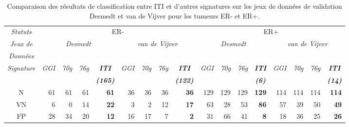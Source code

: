       \begin{sidewaystable}
        \begin{center}
          \caption{Comparaison des résultats de classification entre ITI et d'autres signatures sur les jeux de données de validation Desmedt et van de Vijver pour les tumeurs ER- et ER+.}
          \begin{tabular}{crrrrrrrrrrrrrrrr}
            \toprule
            \multicolumn{1}{c}{\emph{Statuts}} & \multicolumn{8}{c}{ER-} & \multicolumn{8}{c}{ER+} \\
            \cmidrule(r){2-9}\cmidrule(r){10-17}
            \multicolumn{1}{c}{\emph{Jeux de}} & \multicolumn{4}{c}{\multirow{2}{*}{\emph{Desmedt}}} & \multicolumn{4}{c}{\multirow{2}{*}{\emph{van de Vijver}}} & \multicolumn{4}{c}{\multirow{2}{*}{\emph{Desmedt}}} & \multicolumn{4}{c}{\multirow{2}{*}{\emph{van de Vijver}}} \\
            \multicolumn{1}{c}{\emph{Données}} & & & & \\
            \cmidrule(r){2-5}\cmidrule(r){6-9}\cmidrule(r){10-13}\cmidrule(r){14-17}
            \multirow{2}{*}{\emph{Signature}} & \emph{GGI} & \emph{70g} & \emph{76g} & \multicolumn{1}{c}{\emph{\textbf{ITI}}} & \emph{GGI} & \emph{70g} & \emph{76g} & \multicolumn{1}{c}{\emph{\textbf{ITI}}} & \emph{GGI} & \emph{70g} & \emph{76g} & \multicolumn{1}{c}{\emph{\textbf{ITI}}} & \emph{GGI} & \emph{70g} & \emph{76g} & \multicolumn{1}{c}{\emph{\textbf{ITI}}}    \\
                      &     &     &     & \multicolumn{1}{c}{\emph{\textbf{(165)}}}              &     &     &     & \multicolumn{1}{c}{\emph{\textbf{(122)}}}  &     &     &     & \multicolumn{1}{c}{\emph{\textbf{(6)}}}                &     &     &     & \multicolumn{1}{c}{\emph{\textbf{(14)}}}   \\
            \midrule
            N         & 61    & 61    & 61    & \textbf{61}                               & 36    & 36    & 36    & \textbf{36}                   & 129   & 129   & 129   & \textbf{129}                              & 114   & 114   & 114   & \textbf{114}                   \\
            \midrule
            VN        & 6     & 0     & 14    & \textbf{22}                               & 3     & 2     & 12    & \textbf{17}                   & 63    & 28    & 53    & \textbf{86}                               & 57    & 39    & 50    & \textbf{49}                    \\
            FP        & 28    & 34    & 20    & \textbf{12}                               & 16    & 17    & 7     & \textbf{2}                    & 31    & 66    & 41    & \textbf{8}                                & 18    & 36    & 25    & \textbf{26}                    \\

\end{tabular}
\end{center}
\end{sidewaystable}
